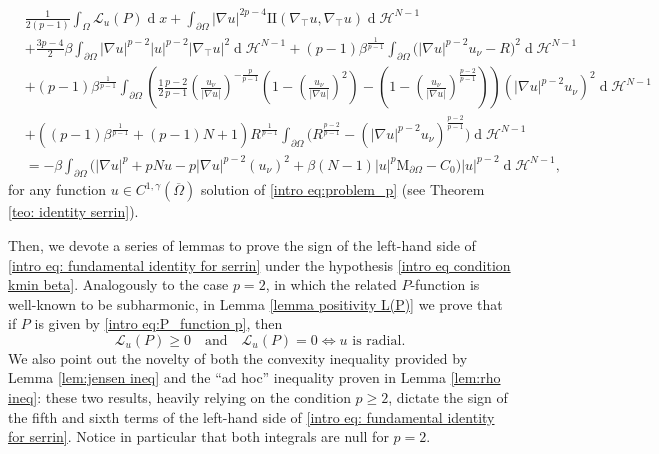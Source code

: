 \documentclass[10pt,a4paper, reqno]{amsart}
\numberwithin{equation}{section}
\renewcommand{\d}[1]{\ensuremath{\operatorname{d}\!{#1}}}
\begin{document}
\begin{equation}\label{intro eq: fundamental identity for serrin}
    \begin{aligned}
    &\frac{1}{2(p-1)}\int_\Omega \mathcal{L}_u(P) \d{x} +\int_{\partial\Omega} |\nabla u|^{2p-4} \mathrm{I\!I}(\nabla_\top u,\nabla_\top u) \d{}\mathcal{H}^{N-1} 
    \\
    &+ \frac{3p-4}{2} \beta \int_{\partial\Omega} |\nabla u|^{p-2}|u|^{p-2}|\nabla_\top u|^2 \d{}\mathcal{H}^{N-1} 
    + (p-1) \beta^{\frac{1}{p-1}} \int_{\partial\Omega} \Big(|\nabla u|^{p-2} u_\nu - R \Big)^2  \d{}\mathcal{H}^{N-1}  
    \\
    &
    + (p-1) \beta^{\frac{1}{p-1}}  \int_{\partial\Omega}  \left( \frac{1}{2} \frac{p-2}{p-1} \left(\frac{u_\nu}{|\nabla u|}\right)^{-\frac{p}{p-1}} \left(1- \left(\frac{u_\nu}{|\nabla u|}\right)^2 \right) - \left(1- \left(\frac{u_\nu}{|\nabla u|}\right)^{\frac{p-2}{p-1}} \right) \right) (|\nabla u|^{p-2} u_\nu)^2 \d{}\mathcal{H}^{N-1} 
    \\
    &
    + \left( (p-1) \beta^{\frac{1}{p-1}} + (p-1)N + 1 \right) R^{\frac{1}{p-1}}  \int_{\partial\Omega} \Big( R^{\frac{p-2}{p-1}} - (|\nabla u|^{p-2} u_\nu)^{\frac{p-2}{p-1}} \Big)  \d{}\mathcal{H}^{N-1}
    \\
    &
    = - \beta \int_{\partial\Omega} \Big( |\nabla u|^p + pNu - p |\nabla u|^{p-2} (u_\nu)^2 + \beta(N-1) |u|^p \mathrm{M}_{\partial\Omega}  - C_0 \Big) |u|^{p-2} \d{}\mathcal{H}^{N-1},  
    \end{aligned}
\end{equation}
for any function $u \in C^{1,\gamma}(\overline{\Omega})$ solution of \eqref{intro eq:problem_p} (see Theorem \ref{teo: identity serrin}).

Then, we devote a series of lemmas to prove the sign of the left-hand side of \eqref{intro eq: fundamental identity for serrin} under the hypothesis \eqref{intro eq condition kmin beta}. 
Analogously to the case $p=2$, in which the related $P$-function is well-known to be subharmonic, in Lemma \ref{lemma positivity L(P)}  we prove that if $P$ is given by \eqref{intro eq:P_function p}, then
\[
\mathcal{L}_u(P) \geq 0 \quad \text{and} \quad \mathcal{L}_u(P)=0 \iff u \text{ is radial}.
\]
We also point out the novelty of both the convexity inequality provided by Lemma \ref{lem:jensen ineq} and the ``ad hoc'' inequality proven in Lemma \ref{lem:rho ineq}: these two results, heavily relying on the condition $p\geq 2$, dictate the sign of the fifth and sixth terms of the left-hand side of \eqref{intro eq: fundamental identity for serrin}. Notice in particular that both integrals are null for $p=2$.
\end{document}
